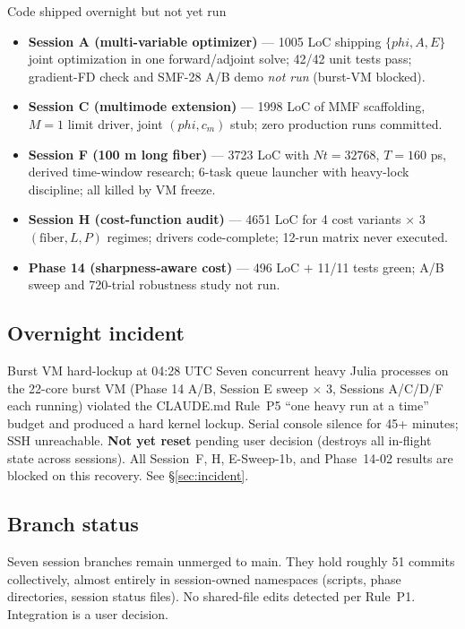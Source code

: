 \documentclass[11pt,letterpaper]{article}
\def\varphi{phi}%
\def\mathrm#1{#1}%
\def\texttt#1{#1}%
\begin{document}
\begin{verdict}{Code shipped overnight but not yet run}
\begin{itemize}[leftmargin=*]
  \item \textbf{Session A (multi-variable optimizer)} --- 1005 LoC shipping $\{\varphi,A,E\}$ joint optimization in one forward/adjoint solve; 42/42 unit tests pass; gradient-FD check and SMF-28 A/B demo \emph{not run} (burst-VM blocked).
  \item \textbf{Session C (multimode extension)} --- 1998 LoC of MMF scaffolding, $M=1$ limit driver, joint $(\varphi, c_m)$ stub; zero production runs committed.
  \item \textbf{Session F (100 m long fiber)} --- 3723 LoC with $\mathrm{Nt}=32768$, $T=160$ ps, derived time-window research; 6-task queue launcher with heavy-lock discipline; all killed by VM freeze.
  \item \textbf{Session H (cost-function audit)} --- 4651 LoC for 4 cost variants $\times$ 3 $(\text{fiber}, L, P)$ regimes; drivers code-complete; 12-run matrix never executed.
  \item \textbf{Phase 14 (sharpness-aware cost)} --- 496 LoC $+$ 11/11 tests green; A/B sweep and 720-trial robustness study not run.
\end{itemize}
\end{verdict}

\subsection{Overnight incident}

\begin{blocker}{Burst VM hard-lockup at 04:28 UTC}
Seven concurrent heavy Julia processes on the 22-core burst VM (Phase 14 A/B, Session E sweep $\times$ 3, Sessions A/C/D/F each running) violated the CLAUDE.md Rule~P5 ``one heavy run at a time'' budget and produced a hard kernel lockup. Serial console silence for 45+ minutes; SSH unreachable. \textbf{Not yet reset} pending user decision (destroys all in-flight state across sessions). All Session~F, H, E-Sweep-1b, and Phase~14-02 results are blocked on this recovery. See \S\ref{sec:incident}.
\end{blocker}

\subsection{Branch status}

Seven session branches remain unmerged to \texttt{main}. They hold roughly 51 commits collectively, almost entirely in session-owned namespaces (scripts, phase directories, session status files). No shared-file edits detected per Rule~P1. Integration is a user decision.
\end{document}
